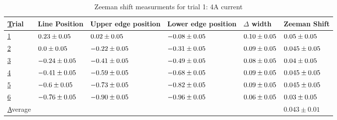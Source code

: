 \begin{table}[H]
    \begin{adjustwidth}{-100pt}{-100pt}
        \centering
        \begin{tabular}{|l|l|l|l|l|l|}
            \hline
            {\ul Trial}   & Line Position                & Upper edge position          & Lower edge position          & $\Delta$ width              & Zeeman Shift                 \\ \hline
            {\ul 1}       & $0.23 \pm 0.05$  & $0.02 \pm 0.05$  & $-0.08 \pm 0.05$ & $0.10 \pm 0.05$ & $0.05 \pm 0.05$  \\ \hline
            {\ul 2}       & $0.0 \pm 0.05$   & $-0.22 \pm 0.05$ & $-0.31 \pm 0.05$ & $0.09 \pm 0.05$ & $0.045 \pm 0.05$ \\ \hline
            {\ul 3}       & $-0.24 \pm 0.05$ & $-0.41 \pm 0.05$ & $-0.49 \pm 0.05$ & $0.08 \pm 0.05$ & $0.04 \pm 0.05$  \\ \hline
            {\ul 4}       & $-0.41 \pm 0.05$ & $-0.59 \pm 0.05$ & $-0.68 \pm 0.05$ & $0.09 \pm 0.05$ & $0.045 \pm 0.05$ \\ \hline
            {\ul 5}       & $-0.6 \pm 0.05$  & $-0.73 \pm 0.05$ & $-0.82 \pm 0.05$ & $0.09 \pm 0.05$ & $0.045 \pm 0.05$ \\ \hline
            {\ul 6}       & $-0.76 \pm 0.05$ & $-0.90 \pm 0.05$ & $-0.96 \pm 0.05$ & $0.06 \pm 0.05$ & $0.03 \pm 0.05$  \\ \hline
            {\ul Average} &                              &                              &                              &                             & $0.043 \pm 0.01$             \\ \hline
        \end{tabular}
    \end{adjustwidth}
    \caption{Zeeman shift measurments for trial 1: 4A current}
\end{table}

